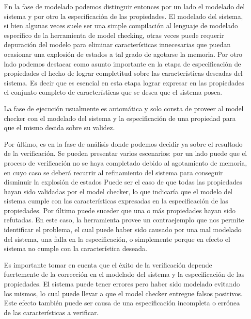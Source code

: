 \documentclass[titlepage, 12pt]{book}
\begin{document}
En la fase de modelado podemos distinguir entonces por un lado el modelado del sistema y por otro la especificaci\'on de las propiedades. El modelado del sistema, si bien algunas veces suele ser una simple compilaci\'on al lenguaje de modelado espec\'ifico de la herramienta de model checking, otras veces puede requerir depuraci\'on del modelo para eliminar caracter\'isticas innecesarias que puedan ocasionar una explosi\'on de estados a tal grado de agotarse la memoria. Por otro lado podemos destacar como asunto importante en la etapa de especificaci\'on de propiedades el hecho de lograr completitud sobre las caracter\'isticas deseadas del sistema. Es decir que es esencial en esta etapa lograr expresar en las propiedades el conjunto completo de caracter\'isticas que se desea que el sistema posea.

La fase de ejecuci\'on usualmente es autom\'atica y solo consta de proveer al model checker con el modelado del sistema y la especificaci\'on de una propiedad para que el mismo decida sobre su validez.

Por \'ultimo, es en la fase de an\'alisis donde podemos decidir ya sobre el resultado de la verificaci\'on. Se pueden presentar varios escenarios: por un lado puede que el proceso de verificaci\'on no se haya completado debido al agotamiento de memoria, en cuyo caso se deber\'a recurrir al refinamiento del sistema para conseguir disminuir la explosi\'on de estados%
Puede ser el caso de que todas las propiedades hayan sido validadas por el model checker, lo que indicar\'ia que el modelo del sistema cumple con las caracter\'isticas expresadas en la especificaci\'on de las propiedades. Por \'ultimo puede suceder que una o m\'as propiedades hayan sido refutadas. En este caso, la herramienta provee un contraejemplo que nos permite identificar el problema, el cual puede haber sido causado por una mal modelado del sistema, una falla en la especificaci\'on, o simplemente porque en efecto el sistema no cumple con la caracter\'istica deseada.

Es importante tomar en cuenta que el \'exito de la verificaci\'on depende fuertemente de la correcci\'on en el modelado del sistema y la especificaci\'on de las propiedades. El sistema puede tener errores pero haber sido modelado evitando los mismos, lo cual puede llevar a que el model checker entregue falsos positivos. Este efecto tambi\'en puede ser causa de una especificaci\'on incompleta o err\'onea de las caracter\'isticas a verificar.
\end{document}
